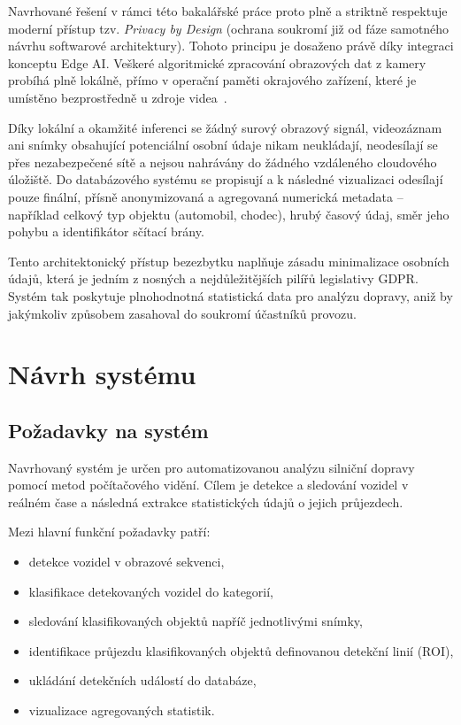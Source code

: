 \documentclass[male,czech,api_bc]{kitheses}
\begin{document}
Navrhované řešení v rámci této bakalářské práce proto plně a striktně respektuje moderní přístup tzv. \textit{Privacy by Design} (ochrana soukromí již od fáze samotného návrhu softwarové architektury). Tohoto principu je dosaženo právě díky integraci konceptu Edge AI. Veškeré algoritmické zpracování obrazových dat z kamery probíhá plně lokálně, přímo v operační paměti okrajového zařízení, které je umístěno bezprostředně u zdroje videa~\cite{li_edge_ai_2020}. 

Díky lokální a okamžité inferenci se žádný surový obrazový signál, videozáznam ani snímky obsahující potenciální osobní údaje nikam neukládají, neodesílají se přes nezabezpečené sítě a nejsou nahrávány do žádného vzdáleného cloudového úložiště. Do databázového systému se propisují a k následné vizualizaci odesílají pouze finální, přísně anonymizovaná a agregovaná numerická metadata – například celkový typ objektu (automobil, chodec), hrubý časový údaj, směr jeho pohybu a identifikátor sčítací brány. 

Tento architektonický přístup bezezbytku naplňuje zásadu minimalizace osobních údajů, která je jedním z nosných a nejdůležitějších pilířů legislativy GDPR. Systém tak poskytuje plnohodnotná statistická data pro analýzu dopravy, aniž by jakýmkoliv způsobem zasahoval do soukromí účastníků provozu.

\chapter{Návrh systému}


\section{Požadavky na systém}
Navrhovaný systém je určen pro automatizovanou analýzu silniční dopravy 
pomocí metod počítačového vidění. Cílem je detekce a sledování vozidel 
v reálném čase a následná extrakce statistických údajů o jejich průjezdech.

Mezi hlavní funkční požadavky patří:

\begin{itemize}
    \item detekce vozidel v obrazové sekvenci,
    \item klasifikace detekovaných vozidel do kategorií,
    \item sledování klasifikovaných objektů napříč jednotlivými snímky,
    \item identifikace průjezdu klasifikovaných objektů definovanou detekční linií (ROI),
    \item ukládání detekčních událostí do databáze,
    \item vizualizace agregovaných statistik.
\end{itemize}
\end{document}

